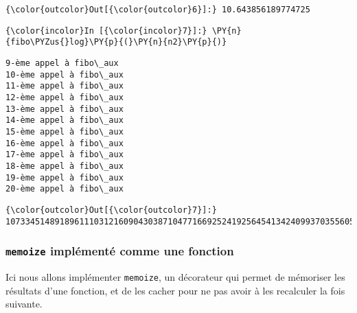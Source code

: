 \begin{Verbatim}[commandchars=\\\{\},frame=single,framerule=0.3mm,rulecolor=\color{cellframecolor}]
{\color{outcolor}Out[{\color{outcolor}6}]:} 10.643856189774725
\end{Verbatim}
            
    \begin{Verbatim}[commandchars=\\\{\},frame=single,framerule=0.3mm,rulecolor=\color{cellframecolor}]
{\color{incolor}In [{\color{incolor}7}]:} \PY{n}{fibo\PYZus{}log}\PY{p}{(}\PY{n}{n2}\PY{p}{)}
\end{Verbatim}


    \begin{Verbatim}[commandchars=\\\{\},frame=single,framerule=0.3mm,rulecolor=\color{cellframecolor}]
9-ème appel à fibo\_aux
10-ème appel à fibo\_aux
11-ème appel à fibo\_aux
12-ème appel à fibo\_aux
13-ème appel à fibo\_aux
14-ème appel à fibo\_aux
15-ème appel à fibo\_aux
16-ème appel à fibo\_aux
17-ème appel à fibo\_aux
18-ème appel à fibo\_aux
19-ème appel à fibo\_aux
20-ème appel à fibo\_aux
\end{Verbatim}

\begin{Verbatim}[commandchars=\\\{\},frame=single,framerule=0.3mm,rulecolor=\color{cellframecolor}]
{\color{outcolor}Out[{\color{outcolor}7}]:} 10733451489189611103121609043038710477166925241925645413424099370355605456852169736033991876014762808340865848447476173426115162172818890323837138136782951865054538417494035229785971002587932638902311416018904156170269354720460896363558168129004231138415225204738582550720791061581463934092726107458349298577292984375276210232582438075
\end{Verbatim}
            
    \hypertarget{memoize-impluxe9mentuxe9-comme-une-fonction}{%
\subsubsection{\texorpdfstring{\texttt{memoize} implémenté comme une
fonction}{memoize implémenté comme une fonction}}\label{memoize-impluxe9mentuxe9-comme-une-fonction}}

    Ici nous allons implémenter \texttt{memoize}, un décorateur qui permet
de mémoriser les résultats d'une fonction, et de les cacher pour ne pas
avoir à les recalculer la fois suivante.

